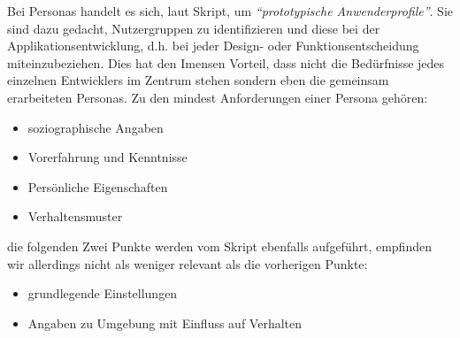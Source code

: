 Bei Personas handelt es sich, laut Skript, um \textit{``prototypische
Anwenderprofile''}. Sie sind dazu gedacht, Nutzergruppen zu identifizieren und
diese bei der Applikationsentwicklung, d.h. bei jeder Design- oder
Funktionsentscheidung miteinzubeziehen. Dies hat den Imensen Vorteil, dass nicht
die Bedürfnisse jedes einzelnen Entwicklers im Zentrum stehen sondern eben die
gemeinsam erarbeiteten Personas. Zu den mindest Anforderungen einer Persona
gehören: 
\begin{itemize}
  \item soziographische Angaben
  \item Vorerfahrung und Kenntnisse
  \item Persönliche Eigenschaften
  \item Verhaltensmuster
\end{itemize}

die folgenden Zwei Punkte werden vom Skript ebenfalls aufgeführt, empfinden wir
allerdings nicht als weniger relevant als die vorherigen Punkte:
\begin{itemize}
  \item grundlegende Einstellungen 
  \item Angaben zu Umgebung mit Einfluss auf Verhalten
\end{itemize}

